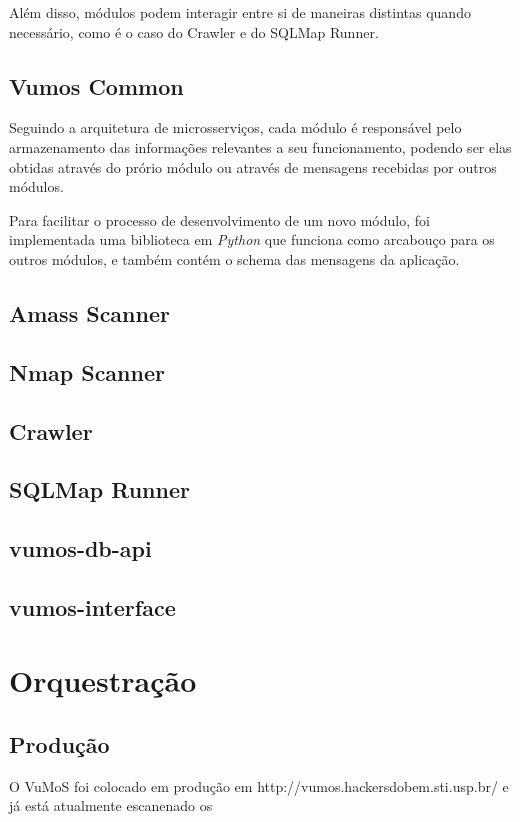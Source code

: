     Além disso, módulos podem interagir entre si de maneiras distintas quando necessário, como é o caso do Crawler e do SQLMap Runner.
    
    \subsection{Vumos Common}
    Seguindo a arquitetura de microsserviços, cada módulo é responsável pelo armazenamento das informações relevantes a seu funcionamento, podendo ser elas obtidas através do prório módulo ou através de mensagens recebidas por outros módulos. 
    
    Para facilitar o processo de desenvolvimento de um novo módulo, foi implementada uma biblioteca em \textit{Python} que funciona como arcabouço para os outros módulos, e também contém o schema das mensagens da aplicação.
    
    \subsection{Amass Scanner}
    \subsection{Nmap Scanner}
    \subsection{Crawler}
    \subsection{SQLMap Runner}

    \subsection{vumos-db-api}
    \subsection{vumos-interface}
    

\section{Orquestração}
    
    \subsection{Produção}
    O VuMoS foi colocado em produção em http://vumos.hackersdobem.sti.usp.br/ e já está atualmente escanenado os  

